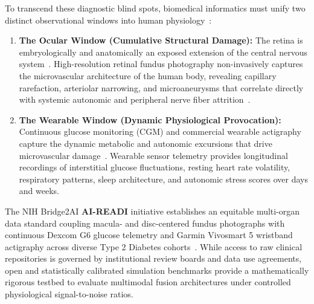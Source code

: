 \documentclass[a4paper,fleqn]{cas-dc}
\begin{document}
To transcend these diagnostic blind spots, biomedical informatics must unify two distinct observational windows into human physiology~\cite{baltrusaitis2018multimodal,dunn2021wearable}:
\begin{enumerate}
    \item \textbf{The Ocular Window (Cumulative Structural Damage):} The retina is embryologically and anatomically an exposed extension of the central nervous system~\cite{wagner2020insights}. High-resolution retinal fundus photography non-invasively captures the microvascular architecture of the human body, revealing capillary rarefaction, arteriolar narrowing, and microaneurysms that correlate directly with systemic autonomic and peripheral nerve fiber attrition~\cite{poplin2018prediction,ting2017development,gulshan2016development,zhou2023retfound,cheung2008retinal}.
    \item \textbf{The Wearable Window (Dynamic Physiological Provocation):} Continuous glucose monitoring (CGM) and commercial wearable actigraphy capture the dynamic metabolic and autonomic excursions that drive microvascular damage~\cite{danne2017international,dunn2021wearable}. Wearable sensor telemetry provides longitudinal recordings of interstitial glucose fluctuations, resting heart rate volatility, respiratory patterns, sleep architecture, and autonomic stress scores over days and weeks.
\end{enumerate}

The NIH Bridge2AI \textbf{AI-READI} initiative establishes an equitable multi-organ data standard coupling macula- and disc-centered fundus photographs with continuous Dexcom G6 glucose telemetry and Garmin Vivosmart 5 wristband actigraphy across diverse Type 2 Diabetes cohorts~\cite{aireadi2024}. While access to raw clinical repositories is governed by institutional review boards and data use agreements, open and statistically calibrated simulation benchmarks provide a mathematically rigorous testbed to evaluate multimodal fusion architectures under controlled physiological signal-to-noise ratios.
\end{document}
